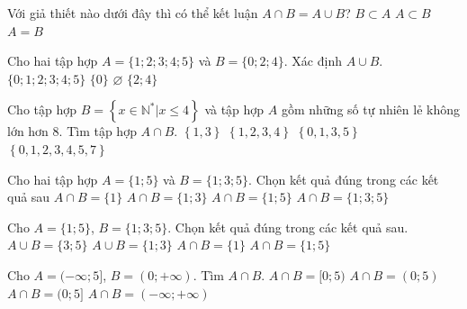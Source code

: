 \begin{ex}%
	Với giả thiết nào dưới đây thì có thể  kết luận $A\cap B=A\cup B$?
		{$B  \subset A $}
		 {$A \subset B $}
		{\True $A=B$} 
\end{ex}

\begin{ex}%
	Cho hai tập hợp $A=\{1; 2; 3; 4; 5\}$ và  $B=\{0; 2; 4\}$. Xác định $A\cup B$.
	 \choice
		{\True $\{0; 1; 2;  3; 4; 5\}$}
		 {$\{0\}$}
		{$\varnothing$} 
		{$\{2;4\}$} 
\end{ex}

\begin{ex}%
	Cho tập hợp $B = \left\{x \in \mathbb{N}^* \big| x \leq 4\right\}$ và tập  hợp $A$ gồm những số tự nhiên lẻ không lớn hơn $8$. Tìm tập hợp $A \cap B$.
	 \choice
		{\True $\left\{1,  3\right\}$}
		{$\left\{1, 2, 3, 4\right\}$} 
		{$\left\{0, 1,  3, 5\right\}$}
		{$\left\{0, 1, 2, 3, 4, 5,  7\right\}$}
\end{ex}

\begin{ex}%
	Cho hai  tập hợp $A=\{1;5\}$ và $B=\{1;3;5\}$. Chọn kết quả đúng trong các kết quả sau
	 \choice
		 { $A \cap B=\{1\}$}
		 {$A \cap B=\{1;3\}$}
		 {\True $A \cap B=\{1;5\}$}
		{$A \cap  B=\{1;3;5\}$}
\end{ex}

\begin{ex}%
	Cho $A=\{1;5\}$, $B=\{1;3;5\}$. Chọn kết quả đúng trong các  kết quả sau.
	 \choice
		{$A  \cup B=\{3;5\}$}
		{$A  \cup B=\{1;3\}$}
		{$A  \cap B=\{1\}$}
		{\True $A \cap  B=\{1;5\}$}
\end{ex}

\begin{ex}%
	 Cho $A=(-\infty;5]$, $B=(0;+\infty)$. Tìm $A\cap B$.
	\choice 
		{$A\cap B=[0;5)$} 
		{$A\cap B=(0;5)$} 
		{\True $A\cap B=(0;5]$} 
		 {$A\cap B=(-\infty;+\infty)$}
	 \loigiai{
	 $A\cap B$ $=(0;5]$.}
\end{ex}

